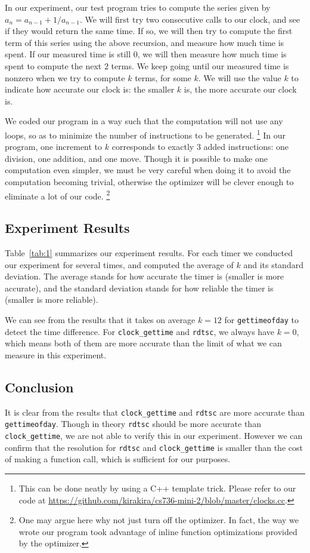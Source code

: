 \documentclass{article}
\begin{document}
In our experiment, our test program tries to compute the series given by $a_n=a_{n-1}+1/a_{n-1}$.
We will first try two consecutive calls to our clock, and see if they would return the same time.
If so, we will then try to compute the first term of this series using the above recursion, and measure how much time is spent.
If our measured time is still $0$, we will then measure how much time is spent to compute the next $2$ terms.
We keep going until our measured time is nonzero when we try to compute $k$ terms, for some $k$.
We will use the value $k$ to indicate how accurate our clock is: the smaller $k$ is, the more accurate our clock is.

We coded our program in a way such that the computation will not use any loops, so as to minimize the number of instructions to be generated.
\footnote{This can be done neatly by using a C++ template trick.
Please refer to our code at \url{https://github.com/kirakira/cs736-mini-2/blob/master/clocks.cc}.}
In our program, one increment to $k$ corresponds to exactly $3$ added instructions: one division, one addition, and one move.
Though it is possible to make one computation even simpler, we must be very careful when doing it to avoid the computation becoming trivial, otherwise the optimizer will be clever enough to eliminate a lot of our code.
\footnote{One may argue here why not just turn off the optimizer.
In fact, the way we wrote our program took advantage of inline function optimizations provided by the optimizer.}

\subsection{Experiment Results}
Table~\ref{tab:1} summarizes our experiment results.
For each timer we conducted our experiment for several times, and computed the average of $k$ and its standard deviation.
The average stands for how accurate the timer is (smaller is more accurate), and the standard deviation stands for how reliable the timer is (smaller is more reliable).

We can see from the results that it takes on average $k=12$ for \texttt{gettimeofday} to detect the time difference.
For \texttt{clock\_gettime} and \texttt{rdtsc}, we always have $k=0$, which means both of them are more accurate than the limit of what we can measure in this experiment.

\subsection{Conclusion}
It is clear from the results that \texttt{clock\_gettime} and \texttt{rdtsc} are more accurate than \texttt{gettimeofday}.
Though in theory \texttt{rdtsc} should be more accurate than \texttt{clock\_gettime}, we are not able to verify this in our experiment.
However we can confirm that the resolution for \texttt{rdtsc} and \texttt{clock\_gettime} is smaller than the cost of making a function call, which is sufficient for our purposes.
\end{document}
